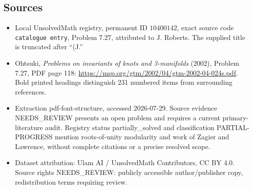\documentclass[11pt]{article}
\begin{document}
\subsection{Sources}
\begin{itemize}
\item Local UnsolvedMath registry, permanent ID \(10400142\), exact source code \texttt{catalogue entry}, Problem 7.27, attributed to J. Roberts. The supplied title is truncated after ``(J.''
\item Ohtsuki, \emph{Problems on invariants of knots and 3-manifolds} (2002), Problem 7.27, PDF page 118: \url{https://msp.org/gtm/2002/04/gtm-2002-04-024s.pdf}. Bold printed headings distinguish 231 numbered items from surrounding references.
\item Extraction pdf-font-structure, accessed 2026-07-29. Source evidence NEEDS\_REVIEW presents an open problem and requires a current primary-literature audit. Registry status partially\_solved and classification PARTIAL-PROGRESS mention roots-of-unity modularity and work of Zagier and Lawrence, without complete citations or a precise resolved scope.
\item Dataset attribution: Ulam AI / UnsolvedMath Contributors, CC BY 4.0. Source rights NEEDS\_REVIEW: publicly accessible author/publisher copy, redistribution terms requiring review.
\end{itemize}
\end{document}
